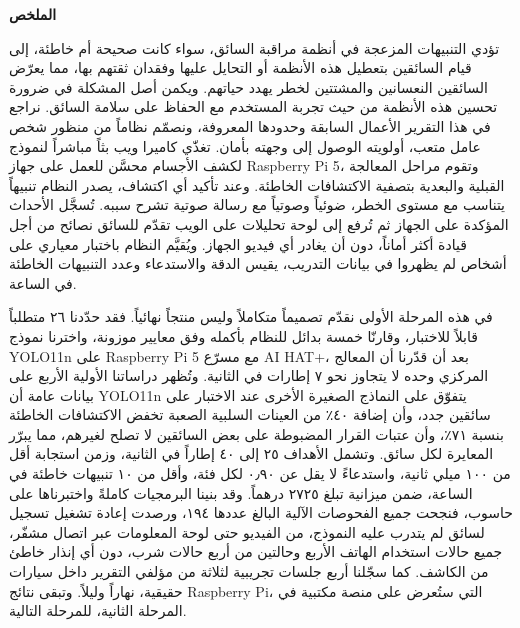 \documentclass[12pt]{article}
\begin{document}
\begin{center}
{\Large\bfseries الملخص}
\end{center}
\vspace{6pt}

تؤدي التنبيهات المزعجة في أنظمة مراقبة السائق، سواء كانت صحيحة أم خاطئة، إلى قيام السائقين بتعطيل هذه الأنظمة أو التحايل عليها وفقدان ثقتهم بها، مما يعرّض السائقين النعسانين والمشتتين لخطر يهدد حياتهم. ويكمن أصل المشكلة في ضرورة تحسين هذه الأنظمة من حيث تجربة المستخدم مع الحفاظ على سلامة السائق. نراجع في هذا التقرير الأعمال السابقة وحدودها المعروفة، ونصمّم نظاماً من منظور شخص عامل متعب، أولويته الوصول إلى وجهته بأمان. تغذّي كاميرا ويب بثاً مباشراً لنموذج لكشف الأجسام محسَّن للعمل على جهاز \foreignlanguage{english}{Raspberry Pi 5}، وتقوم مراحل المعالجة القبلية والبعدية بتصفية الاكتشافات الخاطئة. وعند تأكيد أي اكتشاف، يصدر النظام تنبيهاً يتناسب مع مستوى الخطر، ضوئياً وصوتياً مع رسالة صوتية تشرح سببه. تُسجَّل الأحداث المؤكدة على الجهاز ثم تُرفع إلى لوحة تحليلات على الويب تقدّم للسائق نصائح من أجل قيادة أكثر أماناً، دون أن يغادر أي فيديو الجهاز. ويُقيَّم النظام باختبار معياري على أشخاص لم يظهروا في بيانات التدريب، يقيس الدقة والاستدعاء وعدد التنبيهات الخاطئة في الساعة.

في هذه المرحلة الأولى نقدّم تصميماً متكاملاً وليس منتجاً نهائياً. فقد حدّدنا ٢٦ متطلباً قابلاً للاختبار، وقارنّا خمسة بدائل للنظام بأكمله وفق معايير موزونة، واخترنا نموذج \foreignlanguage{english}{YOLO11n} على \foreignlanguage{english}{Raspberry Pi 5} مع مسرّع \foreignlanguage{english}{AI HAT+}، بعد أن قدّرنا أن المعالج المركزي وحده لا يتجاوز نحو ٧ إطارات في الثانية. وتُظهر دراساتنا الأولية الأربع على بيانات عامة أن \foreignlanguage{english}{YOLO11n} يتفوّق على النماذج الصغيرة الأخرى عند الاختبار على سائقين جدد، وأن إضافة ٤٠٪ من العينات السلبية الصعبة تخفض الاكتشافات الخاطئة بنسبة ٧١٪، وأن عتبات القرار المضبوطة على بعض السائقين لا تصلح لغيرهم، مما يبرّر المعايرة لكل سائق. وتشمل الأهداف ٢٥ إلى ٤٠ إطاراً في الثانية، وزمن استجابة أقل من ١٠٠ ميلي ثانية، واستدعاءً لا يقل عن ٠٫٩٠ لكل فئة، وأقل من ١٠ تنبيهات خاطئة في الساعة، ضمن ميزانية تبلغ ٢٧٢٥ درهماً. وقد بنينا البرمجيات كاملةً واختبرناها على حاسوب، فنجحت جميع الفحوصات الآلية البالغ عددها ١٩٤، ورصدت إعادة تشغيل تسجيل لسائق لم يتدرب عليه النموذج، من الفيديو حتى لوحة المعلومات عبر اتصال مشفّر، جميع حالات استخدام الهاتف الأربع وحالتين من أربع حالات شرب، دون أي إنذار خاطئ من الكاشف. كما سجّلنا أربع جلسات تجريبية لثلاثة من مؤلفي التقرير داخل سيارات حقيقية، نهاراً وليلاً. وتبقى نتائج \foreignlanguage{english}{Raspberry Pi}، التي ستُعرض على منصة مكتبية في المرحلة الثانية، للمرحلة التالية.
\end{document}
